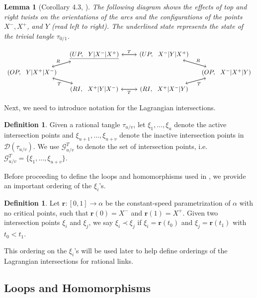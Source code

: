 \documentclass[11pt]{amsart}
\theoremstyle{plain}
\newtheorem{lemmaN}[theoremN]{Lemma}
\theoremstyle{definition}
\newtheorem{definitionN}[theoremN]{Definition}
\theoremstyle{remark}
\begin{document}
\begin{lemmaN}[Corollary 4.3, \cite{W16}]
\label{twistdiagram}
    The following diagram shows the effects of top and right twists on the orientations of the arcs and the configurations of the points $X^-,X^+$, and $Y$ (read left to right). The underlined state represents the state of the trivial tangle $\tau_{0/1}$.
  
\[\begin{tikzcd}[sep=small]
   & \underline{(UP,\,\,\,\, Y\vert X^-\vert X^+)} \arrow[rr,"T"]\arrow[ld] && (UP,\,\,\,\, X^-\vert Y\vert X^+) \arrow[ll]\arrow[rd,"R"] &\\
   (OP,\,\,\,\, Y\vert X^+\vert X^-) \arrow[ru,"R"]\arrow[rd]&&&& (OP,\,\,\,\,X^-\vert X^+\vert Y) \arrow[lu]\arrow[ld,"T"]\\
    & (RI,\,\,\,\, X^+\vert Y\vert X^-) \arrow[lu,"T"]\arrow[rr] && (RI,\,\,\,\, X^+\vert X^-\vert Y) \arrow[ll,"T"]\arrow[ru] &
\end{tikzcd}\]
\end{lemmaN}

Next, we need to introduce notation for the Lagrangian intersections.

\begin{definitionN}
    Given a rational tangle $\tau_{u/v}$, let $\xi_1,...,\xi_u$ denote the active intersection points and $\xi_{u+1},...,\xi_{u+v}$ denote the inactive intersection points in $\mathcal{D}(\tau_{u/v})$. We use $\mathcal{G}_{u/v}^T$ to denote the set of intersection points, i.e. $\mathcal{G}_{u/v}^T=\{\xi_1,...,\xi_{u+v}\}$.
\end{definitionN}

Before proceeding to define the loops and homomorphisms used in \cite{JHpI26}, we provide an important ordering of the $\xi_i$'s.

\begin{definitionN}
\label{precorder}
    Let $\textbf{r}:[0,1]\to\alpha$ be the constant-speed parametrization of $\alpha$ with no critical points, such that $\mathbf{r}(0)=X^-$ and $\mathbf{r}(1)=X^+$. Given two intersection points $\xi_i$ and $\xi_j$, we say $\xi_i\prec \xi_j$ if $\xi_i=\mathbf{r}(t_0)$ and $\xi_j=\mathbf{r}(t_1)$ with $t_0<t_1$.
\end{definitionN}

This ordering on the $\xi_i$'s will be used later to help define orderings of the Lagrangian intersections for rational links.

\subsection{Loops and Homomorphisms}
\label{loophomsec}
\end{document}
